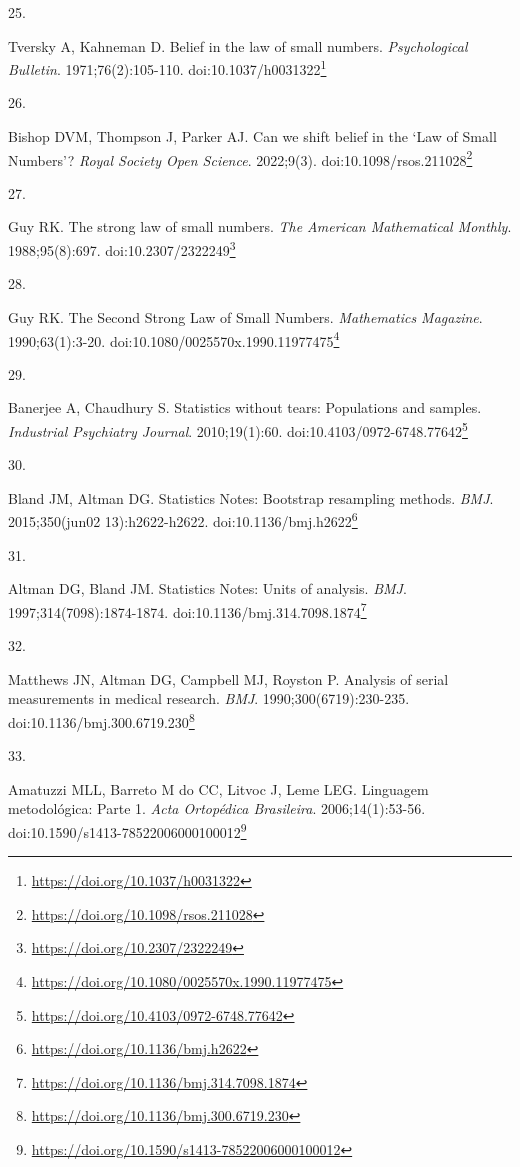 \documentclass[
  a4paper,
]{book}
\newlength{\cslhangindent}
\newlength{\csllabelwidth}
\newlength{\cslentryspacingunit} %
\newenvironment{CSLReferences}[2] %
 {%
  \setlength{\parindent}{0pt}
  \ifodd #1
  \let\oldpar\par
  \def\par{\hangindent=\cslhangindent\oldpar}
  \fi
  \setlength{\parskip}{#2\cslentryspacingunit}
 }%
 {}
\newcommand{\CSLLeftMargin}[1]{\parbox[t]{\csllabelwidth}{#1}}
\newcommand{\CSLRightInline}[1]{\parbox[t]{\linewidth - \csllabelwidth}{#1}\break}
\renewcommand{\href}[2]{#2\footnote{\url{#1}}}
\begin{document}
\begin{CSLReferences}{0}{0}
\leavevmode{}%
\CSLLeftMargin{25. }%
\CSLRightInline{Tversky A, Kahneman D. Belief in the law of small numbers. \emph{Psychological Bulletin}. 1971;76(2):105-110. doi:\href{https://doi.org/10.1037/h0031322}{10.1037/h0031322}}

\leavevmode{}%
\CSLLeftMargin{26. }%
\CSLRightInline{Bishop DVM, Thompson J, Parker AJ. Can we shift belief in the {`}Law of Small Numbers{'}? \emph{Royal Society Open Science}. 2022;9(3). doi:\href{https://doi.org/10.1098/rsos.211028}{10.1098/rsos.211028}}

\leavevmode{}%
\CSLLeftMargin{27. }%
\CSLRightInline{Guy RK. The strong law of small numbers. \emph{The American Mathematical Monthly}. 1988;95(8):697. doi:\href{https://doi.org/10.2307/2322249}{10.2307/2322249}}

\leavevmode{}%
\CSLLeftMargin{28. }%
\CSLRightInline{Guy RK. The Second Strong Law of Small Numbers. \emph{Mathematics Magazine}. 1990;63(1):3-20. doi:\href{https://doi.org/10.1080/0025570x.1990.11977475}{10.1080/0025570x.1990.11977475}}

\leavevmode{}%
\CSLLeftMargin{29. }%
\CSLRightInline{Banerjee A, Chaudhury S. Statistics without tears: Populations and samples. \emph{Industrial Psychiatry Journal}. 2010;19(1):60. doi:\href{https://doi.org/10.4103/0972-6748.77642}{10.4103/0972-6748.77642}}

\leavevmode{}%
\CSLLeftMargin{30. }%
\CSLRightInline{Bland JM, Altman DG. Statistics Notes: Bootstrap resampling methods. \emph{BMJ}. 2015;350(jun02 13):h2622-h2622. doi:\href{https://doi.org/10.1136/bmj.h2622}{10.1136/bmj.h2622}}

\leavevmode{}%
\CSLLeftMargin{31. }%
\CSLRightInline{Altman DG, Bland JM. Statistics Notes: Units of analysis. \emph{BMJ}. 1997;314(7098):1874-1874. doi:\href{https://doi.org/10.1136/bmj.314.7098.1874}{10.1136/bmj.314.7098.1874}}

\leavevmode{}%
\CSLLeftMargin{32. }%
\CSLRightInline{Matthews JN, Altman DG, Campbell MJ, Royston P. Analysis of serial measurements in medical research. \emph{BMJ}. 1990;300(6719):230-235. doi:\href{https://doi.org/10.1136/bmj.300.6719.230}{10.1136/bmj.300.6719.230}}

\leavevmode{}%
\CSLLeftMargin{33. }%
\CSLRightInline{Amatuzzi MLL, Barreto M do CC, Litvoc J, Leme LEG. Linguagem metodológica: Parte 1. \emph{Acta Ortopédica Brasileira}. 2006;14(1):53-56. doi:\href{https://doi.org/10.1590/s1413-78522006000100012}{10.1590/s1413-78522006000100012}}


\end{CSLReferences}
\end{document}
